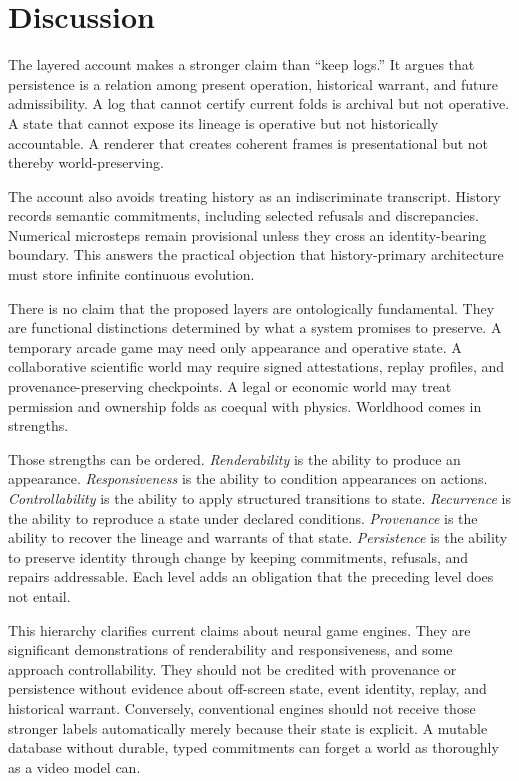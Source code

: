 \documentclass[11pt]{article}
\begin{document}
\section{Discussion}

The layered account makes a stronger claim than ``keep logs.'' It argues that persistence is a relation among present operation, historical warrant, and future admissibility. A log that cannot certify current folds is archival but not operative. A state that cannot expose its lineage is operative but not historically accountable. A renderer that creates coherent frames is presentational but not thereby world-preserving.

The account also avoids treating history as an indiscriminate transcript. History records semantic commitments, including selected refusals and discrepancies. Numerical microsteps remain provisional unless they cross an identity-bearing boundary. This answers the practical objection that history-primary architecture must store infinite continuous evolution.

There is no claim that the proposed layers are ontologically fundamental. They are functional distinctions determined by what a system promises to preserve. A temporary arcade game may need only appearance and operative state. A collaborative scientific world may require signed attestations, replay profiles, and provenance-preserving checkpoints. A legal or economic world may treat permission and ownership folds as coequal with physics. Worldhood comes in strengths.

Those strengths can be ordered. \emph{Renderability} is the ability to produce an appearance. \emph{Responsiveness} is the ability to condition appearances on actions. \emph{Controllability} is the ability to apply structured transitions to state. \emph{Recurrence} is the ability to reproduce a state under declared conditions. \emph{Provenance} is the ability to recover the lineage and warrants of that state. \emph{Persistence} is the ability to preserve identity through change by keeping commitments, refusals, and repairs addressable. Each level adds an obligation that the preceding level does not entail.

This hierarchy clarifies current claims about neural game engines. They are significant demonstrations of renderability and responsiveness, and some approach controllability. They should not be credited with provenance or persistence without evidence about off-screen state, event identity, replay, and historical warrant. Conversely, conventional engines should not receive those stronger labels automatically merely because their state is explicit. A mutable database without durable, typed commitments can forget a world as thoroughly as a video model can.
\end{document}
